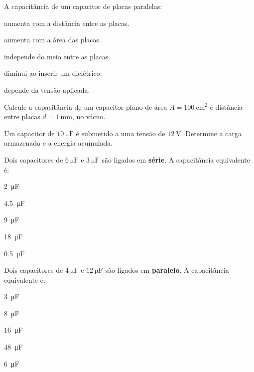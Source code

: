 \blocofixacao
\begin{questao}[1]{}

A capacitância de um capacitor de placas paralelas:
\begin{alternativas}
\item aumenta com a distância entre as placas.
\item aumenta com a área das placas.
\item independe do meio entre as placas.
\item diminui ao inserir um dielétrico.
\item depende da tensão aplicada.
\end{alternativas}


\end{questao}
\begin{questao}[1]{}

Calcule a capacitância de um capacitor plano de área $A = \SI{100}{\centi\meter\squared}$
e distância entre placas $d = \SI{1}{\milli\meter}$, no vácuo.


\end{questao}
\begin{questao}[1]{}

Um capacitor de $\SI{10}{\micro\farad}$ é submetido a uma tensão de
$\SI{12}{\volt}$. Determine a carga armazenada e a energia acumulada.


\end{questao}
\begin{questao}[1]{}

Dois capacitores de $\SI{6}{\micro\farad}$ e $\SI{3}{\micro\farad}$ são ligados
em \textbf{série}. A capacitância equivalente é:
\begin{alternativas}[3]
\item \SI{2}{\micro\farad}
\item \SI{4.5}{\micro\farad}
\item \SI{9}{\micro\farad}
\item \SI{18}{\micro\farad}
\item \SI{0.5}{\micro\farad}
\end{alternativas}


\end{questao}
\begin{questao}[1]{}

Dois capacitores de $\SI{4}{\micro\farad}$ e $\SI{12}{\micro\farad}$ são ligados
em \textbf{paralelo}. A capacitância equivalente é:
\begin{alternativas}[3]
\item \SI{3}{\micro\farad}
\item \SI{8}{\micro\farad}
\item \SI{16}{\micro\farad}
\item \SI{48}{\micro\farad}
\item \SI{6}{\micro\farad}
\end{alternativas}


\end{questao}
